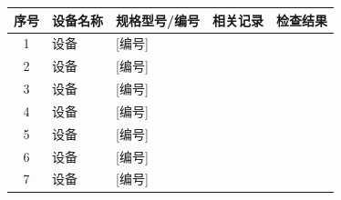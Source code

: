 \documentclass[UTF8,10pt,a4paper,fontset=fandol]{ctexart}
\newcommand{\fieldvalue}[1]{#1}
\newcommand{\handwritten}[1]{#1}
\begin{document}
\begin{table}[h]
\centering
\small
\begin{tabularx}{\textwidth}{|c|X|X|X|c|}
\hline
序号 & 设备名称 & 规格型号/编号 & 相关记录 & 检查结果 \\
\hline
1 &
设备 &
\fieldvalue{\handwritten{[编号]}} &
\fieldvalue{\handwritten{\checkmark}} &
\\
\hline
2 &
设备 &
\fieldvalue{\handwritten{[编号]}} &
\fieldvalue{\handwritten{\checkmark}} &
\\
\hline
3 &
设备 &
\fieldvalue{\handwritten{[编号]}} &
\fieldvalue{\handwritten{\checkmark}} &
\\
\hline
4 &
设备 &
\fieldvalue{\handwritten{[编号]}} &
\fieldvalue{\handwritten{\checkmark}} &
\\
\hline
5 &
设备 &
\fieldvalue{\handwritten{[编号]}} &
\fieldvalue{\handwritten{\checkmark}} &
\\
\hline
6 &
设备 &
\fieldvalue{\handwritten{[编号]}} &
\fieldvalue{\handwritten{\checkmark}} &
\\
\hline
7 &
设备 &
\fieldvalue{\handwritten{[编号]}} &
\fieldvalue{\handwritten{\checkmark}} &

\end{tabularx}
\end{table}
\end{document}
